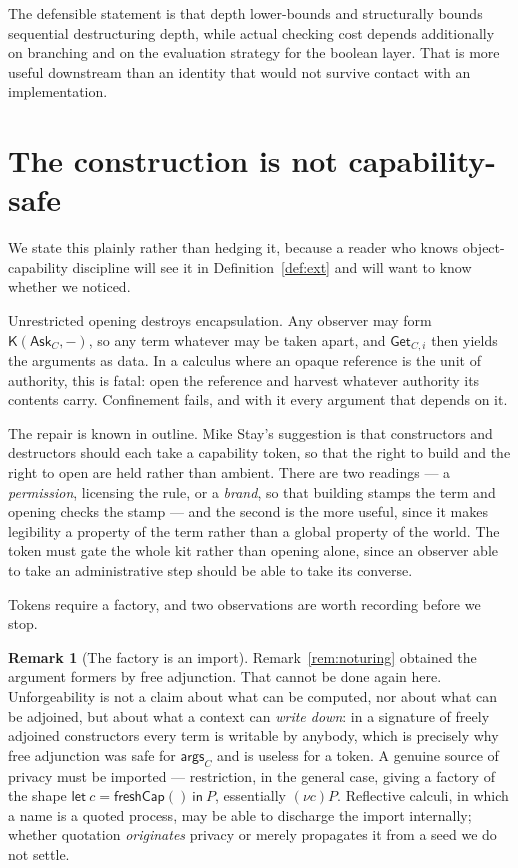 \documentclass[11pt]{article}
\theoremstyle{plain}
\theoremstyle{definition}
\newtheorem{remark}[theorem]{Remark}
\newcommand{\Kc}{\mathsf{K}}
\newcommand{\Ask}{\mathsf{Ask}}
\newcommand{\Get}{\mathsf{Get}}
\newcommand{\args}{\mathsf{args}}
\begin{document}
The defensible statement is that depth lower-bounds and structurally bounds sequential destructuring
depth, while actual checking cost depends additionally on branching and on the evaluation strategy for
the boolean layer. That is more useful downstream than an identity that would not survive contact with
an implementation.

\section{The construction is not capability-safe}
\label{sec:security}

We state this plainly rather than hedging it, because a reader who knows object-capability discipline
will see it in Definition~\ref{def:ext} and will want to know whether we noticed.

Unrestricted opening destroys encapsulation. Any observer may form $\Kc(\Ask_C, -)$, so any term
whatever may be taken apart, and $\Get_{C,i}$ then yields the arguments as data. In a calculus where an
opaque reference is the unit of authority, this is fatal: open the reference and harvest whatever
authority its contents carry. Confinement fails, and with it every argument that depends on it.

The repair is known in outline. Mike Stay's suggestion is that constructors and destructors should each
take a capability token, so that the right to build and the right to open are held rather than ambient.
There are two readings --- a \emph{permission}, licensing the rule, or a \emph{brand}, so that building
stamps the term and opening checks the stamp --- and the second is the more useful, since it makes
legibility a property of the term rather than a global property of the world. The token must gate the
whole kit rather than opening alone, since an observer able to take an administrative step should be
able to take its converse.

Tokens require a factory, and two observations are worth recording before we stop.

\begin{remark}[The factory is an import]
\label{rem:import}
Remark~\ref{rem:noturing} obtained the argument formers by free adjunction. That cannot be done again
here. Unforgeability is not a claim about what can be computed, nor about what can be adjoined, but
about what a context can \emph{write down}: in a signature of freely adjoined constructors every term
is writable by anybody, which is precisely why free adjunction was safe for $\args_C$ and is useless for
a token. A genuine source of privacy must be imported --- restriction, in the general case, giving a
factory of the shape $\mathsf{let}\ c = \mathsf{freshCap}()\ \mathsf{in}\ P$, essentially $(\nu c)P$.
Reflective calculi, in which a name is a quoted process, may be able to discharge the import internally;
whether quotation \emph{originates} privacy or merely propagates it from a seed we do not settle.
\end{remark}
\end{document}
